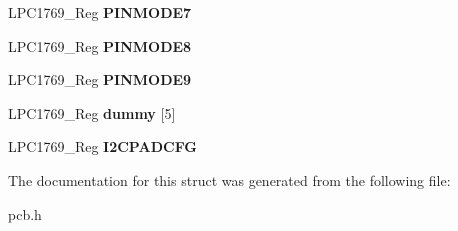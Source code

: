 \begin{DoxyCompactItemize}
\item 
\hypertarget{struct_l_p_c1769___p_c_b_aa62c7b0c347088420f72b5813c81d47a}{L\+P\+C1769\+\_\+\+Reg {\bfseries P\+I\+N\+M\+O\+D\+E7}}\label{struct_l_p_c1769___p_c_b_aa62c7b0c347088420f72b5813c81d47a}

\item 
\hypertarget{struct_l_p_c1769___p_c_b_a7bf2ea56335461bd895f21f2b768644c}{L\+P\+C1769\+\_\+\+Reg {\bfseries P\+I\+N\+M\+O\+D\+E8}}\label{struct_l_p_c1769___p_c_b_a7bf2ea56335461bd895f21f2b768644c}

\item 
\hypertarget{struct_l_p_c1769___p_c_b_a1b997b7372ce5319abe07c282867174d}{L\+P\+C1769\+\_\+\+Reg {\bfseries P\+I\+N\+M\+O\+D\+E9}}\label{struct_l_p_c1769___p_c_b_a1b997b7372ce5319abe07c282867174d}

\item 
\hypertarget{struct_l_p_c1769___p_c_b_a6afdeb9bf6207dc7ae6b6795693ee3cb}{L\+P\+C1769\+\_\+\+Reg {\bfseries dummy} \mbox{[}5\mbox{]}}\label{struct_l_p_c1769___p_c_b_a6afdeb9bf6207dc7ae6b6795693ee3cb}

\item 
\hypertarget{struct_l_p_c1769___p_c_b_a84116bf3dbb7624457ee6095f63a6edc}{L\+P\+C1769\+\_\+\+Reg {\bfseries I2\+C\+P\+A\+D\+C\+F\+G}}\label{struct_l_p_c1769___p_c_b_a84116bf3dbb7624457ee6095f63a6edc}

\end{DoxyCompactItemize}


The documentation for this struct was generated from the following file\+:\begin{DoxyCompactItemize}
\item 
pcb.\+h\end{DoxyCompactItemize}
